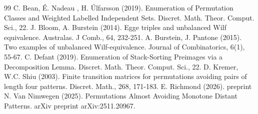 \documentclass[11pt]{amsart}
\theoremstyle{remark}
\numberwithin{equation}{section}
\begin{document}
\begin{thebibliography}{99}
 C. Bean, É. Nadeau , H. Úlfarsson  (2019). Enumeration of Permutation Classes and Weighted Labelled Independent Sets. Discret. Math. Theor. Comput. Sci., 22.
  J. Bloom, A. Burstein (2014). Egge triples and unbalanced Wilf equivalence. Australas. J Comb., 64, 232-251.
 A. Burstein,  J. Pantone (2015). Two examples of unbalanced Wilf-equivalence. Journal of Combinatorics, 6(1), 55-67.
 C. Defant (2019). Enumeration of Stack-Sorting Preimages via a Decomposition Lemma. Discret. Math. Theor. Comput. Sci., 22.
 D. Kremer, W.C. Shiu  (2003). Finite transition matrices for permutations avoiding pairs of length four patterns. Discret. Math., 268, 171-183.
 E. Richmond (2026). preprint
 N. Van Nimwegen (2025). Permutations Almost Avoiding Monotone Distant Patterns. arXiv preprint arXiv:2511.20967.




\end{thebibliography}
\end{document}
